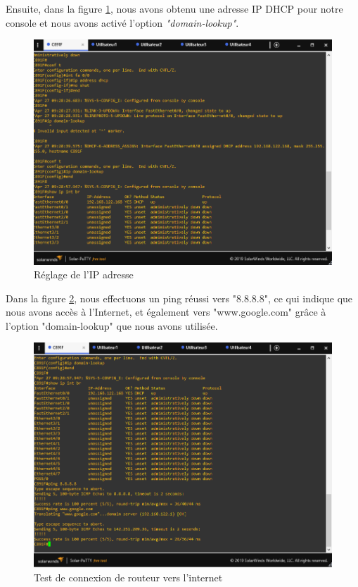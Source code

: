 Ensuite, dans la figure \ref{Chap2.2.2}, nous avons obtenu une adresse IP DHCP pour notre console et nous avons activé l'option \textit{"domain-lookup"}. 


\begin{figure}[H]
 \centering
    \includegraphics[width=16cm]{Images/BRades-Topologie2.png}
    \caption{Réglage de l'IP adresse}
    \label{Chap2.2.2}
\end{figure}


Dans la figure \ref{Chap2.2.3}, nous effectuons un ping réussi vers "8.8.8.8", ce qui indique que nous avons accès à l'Internet, et également vers "www.google.com" grâce à l'option "domain-lookup" que nous avons utilisée.

\begin{figure}[H]
 \centering
    \includegraphics[width=16cm]{Images/BRades-Topologie3.png}
    \caption{Test de connexion de routeur vers l'internet}
    \label{Chap2.2.3}
\end{figure}

